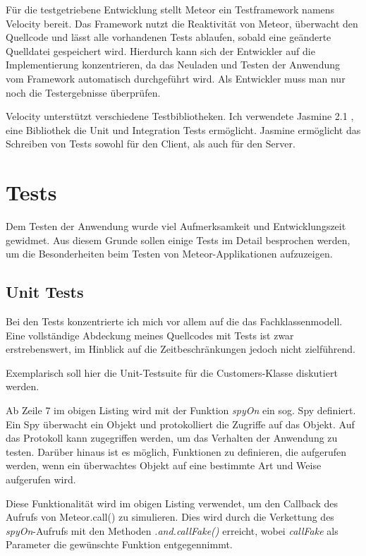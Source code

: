 Für die testgetriebene Entwicklung stellt Meteor ein Testframework namens
Velocity \cite{velocity} bereit. Das Framework nutzt die Reaktivität von Meteor,
überwacht den Quellcode und lässt alle vorhandenen Tests ablaufen, sobald eine
geänderte Quelldatei gespeichert wird. Hierdurch kann sich der Entwickler auf
die Implementierung konzentrieren, da das Neuladen und Testen der Anwendung vom
Framework automatisch durchgeführt wird. Als Entwickler muss man nur noch die
Testergebnisse überprüfen.

Velocity unterstützt verschiedene Testbibliotheken. Ich verwendete Jasmine 2.1
\cite{jasmine}, eine Bibliothek die Unit und Integration Tests ermöglicht.
Jasmine ermöglicht das Schreiben von Tests sowohl für den Client, als auch für
den Server.

\section{Tests}

Dem Testen der Anwendung wurde viel Aufmerksamkeit und Entwicklungszeit
gewidmet. Aus diesem Grunde sollen einige Tests im Detail besprochen werden, um
die Besonderheiten beim Testen von Meteor-Applikationen aufzuzeigen.

\subsection{Unit Tests}

Bei den Tests konzentrierte ich mich vor allem auf die das Fachklassenmodell.
Eine vollständige Abdeckung meines Quellcodes mit Tests ist zwar erstrebenswert,
im Hinblick auf die Zeitbeschränkungen jedoch nicht zielführend.

Exemplarisch soll hier die Unit-Testsuite für die Customers-Klasse diskutiert
werden.



Ab Zeile 7 im obigen Listing wird mit der Funktion \textit{spyOn} ein sog. Spy
definiert. Ein Spy überwacht ein Objekt und protokolliert die Zugriffe auf das
Objekt. Auf das Protokoll kann zugegriffen werden, um das Verhalten der
Anwendung zu testen. Darüber hinaus ist es möglich, Funktionen zu definieren,
die aufgerufen werden, wenn ein überwachtes Objekt auf eine bestimmte Art und
Weise aufgerufen wird.

Diese Funktionalität wird im obigen Listing verwendet, um den Callback des
Aufrufs von Meteor.call() zu simulieren. Dies wird durch die Verkettung des
\textit{spyOn}-Aufrufs mit den Methoden \textit{.and.callFake()} erreicht, wobei
\textit{callFake} als Parameter die gewünschte Funktion entgegennimmt.

